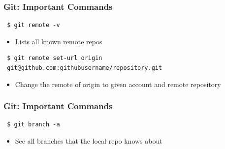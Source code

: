 \documentclass{beamer} %
\begin{document}
\begin{frame}[t, fragile]
\frametitle{Git: Important Commands}

\begin{verbatim} 
 $ git remote -v
\end{verbatim}

\begin{itemize}
	\item Lists all known remote repos
\end{itemize}

\begin{verbatim}
 $ git remote set-url origin 
 git@github.com:githubusername/repository.git
\end{verbatim}

\begin{itemize}
	\item Change the remote of origin to given account and remote repository
\end{itemize}
\end{frame}


\begin{frame}[t, fragile]
\frametitle{Git: Important Commands}

\begin{verbatim} 
 $ git branch -a
\end{verbatim}

\begin{itemize}
	\item See all branches that the local repo knows about
\end{itemize}
\end{frame}
\end{document}
